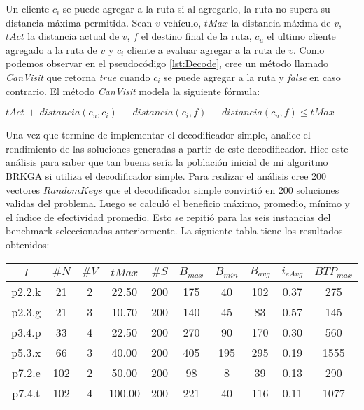 Un cliente $c_i$ se puede agregar a la ruta si al agregarlo, la ruta no supera su distancia máxima permitida. Sean $v$ vehículo, $tMax$ la distancia máxima de $v$, $tAct$ la distancia actual de $v$, $f$ el destino final de la ruta, $c_u$ el ultimo cliente agregado a la ruta de $v$ y $c_i$ cliente a evaluar agregar a la ruta de $v$. Como podemos observar en el pseudocódigo \ref{lst:Decode}, cree un método llamado \textit{CanVisit} que retorna \textit{true} cuando $c_i$ se puede agregar a la ruta y \textit{false} en caso contrario. El método \textit{CanVisit} modela la siguiente fórmula:

\bigskip

\( tAct\, +\, distancia(c_u, c_i)\, +\, distancia(c_i, f)\, -\, distancia(c_u, f) \leq tMax\)

\bigskip

Una vez que termine de implementar el decodificador simple, analice el rendimiento de las soluciones generadas a partir de este decodificador. Hice este análisis para saber que tan buena sería la población inicial de mi algoritmo BRKGA si utiliza el decodificador simple. Para realizar el análisis cree 200 vectores $RandomKeys$ que el decodificador simple convirtió en 200 soluciones validas del problema. Luego se calculó el beneficio máximo, promedio, mínimo y el índice de efectividad promedio. Esto se repitió para las seis instancias del benchmark seleccionadas anteriormente. La siguiente tabla tiene los resultados obtenidos:

\begin{center}
\begin{tabular}{ |c|c|c|c|c|c|c|c|c|c| } 
\hline
$I$ & $\#N$ & $\#V$ & $tMax$ & $\#S$ & $B_{max}$ & $B_{min}$ & $B_{avg}$ & $i_{eAvg}$ & $BTP_{max}$ \\
\hline
p2.2.k & 21 & 2 & 22.50 & 200 & 175 & 40 & 102 & 0.37 & 275  \\
p2.3.g & 21 & 3 & 10.70 & 200 & 140 & 45 & 83 & 0.57 & 145  \\
p3.4.p & 33 & 4 & 22.50 & 200 & 270 & 90 & 170 & 0.30 & 560  \\
p5.3.x & 66 & 3 & 40.00 & 200 & 405 & 195 & 295 & 0.19 & 1555  \\
p7.2.e & 102 & 2 & 50.00 & 200 & 98 & 8 & 39 & 0.13 & 290  \\
p7.4.t & 102 & 4 & 100.00 & 200 & 221 & 40 & 116 & 0.11 & 1077  \\
\hline
\end{tabular}
\end{center}


